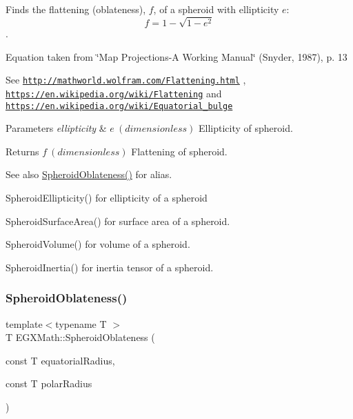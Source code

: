 Finds the flattening (oblateness), $f$, of a spheroid with ellipticity $e$\+: \[ f = 1 - \sqrt{1-e^2} \]. 

Equation taken from \char`\"{}\+Map Projections-\/\+A Working Manual\char`\"{} (Snyder, 1987), p. 13

See \href{http://mathworld.wolfram.com/Flattening.html}{\tt http\+://mathworld.\+wolfram.\+com/\+Flattening.\+html} , \href{https://en.wikipedia.org/wiki/Flattening}{\tt https\+://en.\+wikipedia.\+org/wiki/\+Flattening} and \href{https://en.wikipedia.org/wiki/Equatorial_bulge}{\tt https\+://en.\+wikipedia.\+org/wiki/\+Equatorial\+\_\+bulge} 
\begin{DoxyParams}{Parameters}
{\em ellipticity} & $ e\ (dimensionless)$ Ellipticity of spheroid. \\
\hline
\end{DoxyParams}
\begin{DoxyReturn}{Returns}
$ f\ (dimensionless)$ Flattening of spheroid. 
\end{DoxyReturn}
\begin{DoxySeeAlso}{See also}
\mbox{\hyperlink{group___e_g_x_math-_geometry-3_d-_spheroid-_flattening_gaf2530de595124e75a7f58482d617cfce}{Spheroid\+Oblateness()}} for alias. 

Spheroid\+Ellipticity() for ellipticity of a spheroid 

Spheroid\+Surface\+Area() for surface area of a spheroid. 

Spheroid\+Volume() for volume of a spheroid. 

Spheroid\+Inertia() for inertia tensor of a spheroid. 
\end{DoxySeeAlso}
\mbox{\label{group___e_g_x_math-_geometry-3_d-_spheroid-_flattening_ga8f547f5dd10721862b602c7769eb6116}} 
\subsubsection{\texorpdfstring{Spheroid\+Oblateness()}{SpheroidOblateness()}\hspace{0.1cm}{\footnotesize\ttfamily [1/2]}}
{\footnotesize\ttfamily template$<$typename T $>$ \\
T E\+G\+X\+Math\+::\+Spheroid\+Oblateness (\begin{DoxyParamCaption}\item[{const T}]{equatorial\+Radius,  }\item[{const T}]{polar\+Radius }\end{DoxyParamCaption})}



